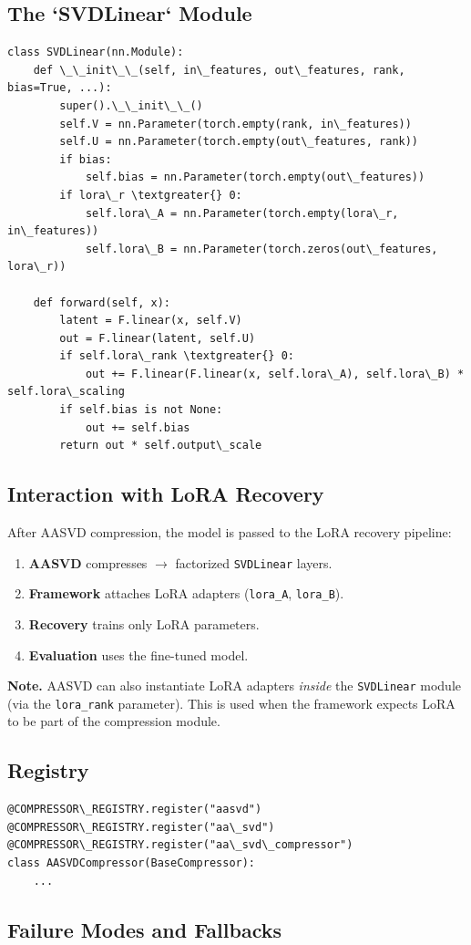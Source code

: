 \subsection{The `SVDLinear` Module}

\begin{lstlisting}
class SVDLinear(nn.Module):
    def \_\_init\_\_(self, in\_features, out\_features, rank, bias=True, ...):
        super().\_\_init\_\_()
        self.V = nn.Parameter(torch.empty(rank, in\_features))
        self.U = nn.Parameter(torch.empty(out\_features, rank))
        if bias:
            self.bias = nn.Parameter(torch.empty(out\_features))
        if lora\_r \textgreater{} 0:
            self.lora\_A = nn.Parameter(torch.empty(lora\_r, in\_features))
            self.lora\_B = nn.Parameter(torch.zeros(out\_features, lora\_r))
    
    def forward(self, x):
        latent = F.linear(x, self.V)
        out = F.linear(latent, self.U)
        if self.lora\_rank \textgreater{} 0:
            out += F.linear(F.linear(x, self.lora\_A), self.lora\_B) * self.lora\_scaling
        if self.bias is not None:
            out += self.bias
        return out * self.output\_scale
\end{lstlisting}

\subsection{Interaction with LoRA Recovery}

After AASVD compression, the model is passed to the LoRA recovery pipeline:

\begin{enumerate}
\item \textbf{AASVD} compresses $\to$ factorized \texttt{SVDLinear} layers.
\item \textbf{Framework} attaches LoRA adapters (\texttt{lora\_A}, \texttt{lora\_B}).
\item \textbf{Recovery} trains only LoRA parameters.
\item \textbf{Evaluation} uses the fine-tuned model.

\end{enumerate}
\textbf{Note.} AASVD can also instantiate LoRA adapters \textit{inside} the \texttt{SVDLinear} 
module (via the \texttt{lora\_rank} parameter). This is used when the framework 
expects LoRA to be part of the compression module.

\subsection{Registry}

\begin{lstlisting}
@COMPRESSOR\_REGISTRY.register("aasvd")
@COMPRESSOR\_REGISTRY.register("aa\_svd")
@COMPRESSOR\_REGISTRY.register("aa\_svd\_compressor")
class AASVDCompressor(BaseCompressor):
    ...
\end{lstlisting}

\subsection{Failure Modes and Fallbacks}
